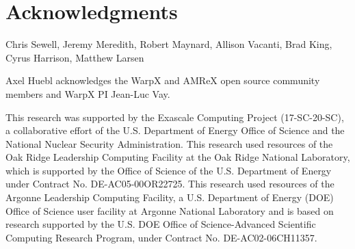 \section{Acknowledgments}


Chris Sewell, Jeremy Meredith, Robert Maynard, Allison Vacanti, Brad King, Cyrus Harrison, Matthew Larsen

Axel Huebl acknowledges the WarpX and AMReX open source community members and WarpX PI Jean-Luc Vay.

This research was supported by the Exascale Computing Project (17-SC-20-SC), a collaborative effort of the U.S. Department of Energy Office of Science and the National Nuclear Security Administration.
This research used resources of the Oak Ridge Leadership Computing Facility at the Oak Ridge National Laboratory, which is supported by the Office of Science of the U.S. Department of Energy under Contract No. DE-AC05-00OR22725.
This research used resources of the Argonne Leadership Computing Facility, a U.S. Department of Energy (DOE) Office of Science user facility at Argonne National Laboratory and is based on research supported by the U.S. DOE Office of Science-Advanced Scientific Computing Research Program, under Contract No. DE-AC02-06CH11357.
